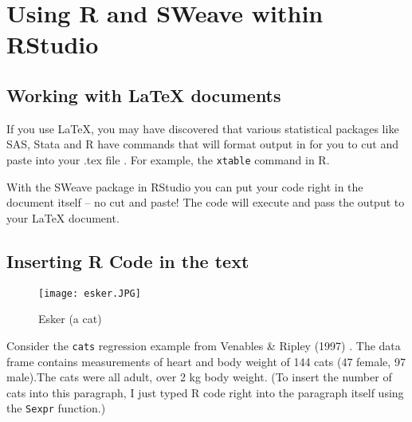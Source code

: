 \chapter{Using R and SWeave within RStudio} 
\label{R and SWeave}

\section{Working with \LaTeX{} documents}
If you use \LaTeX{}, you may have discovered that various statistical packages like SAS, Stata and R have commands that will format output in  for you to cut and paste into your .tex file \cite{HelpStatPack}.   For example, the \texttt{xtable} command in R.  

With the SWeave package in RStudio you can put your code right in the document itself -- no cut and paste!  The code will execute and pass the output to your \LaTeX{} document.


\section{Inserting R Code in the text}
\begin{wrapfigure}[8]{r}{0.4\textwidth}
  \vspace{-20pt}
  \begin{center}
    \texttt{[image: esker.JPG]}
  \end{center}
    \vspace{-20pt}
  \caption{Esker (a cat)}
\end{wrapfigure}

Consider the \texttt{cats} regression example from Venables \& Ripley
(1997) \cite{Venables:1997fk}. The data frame contains measurements of heart and body weight
of 144 cats (47 female,
97 male).The cats were all adult, over 2 kg body weight.   (To insert the number of cats into this paragraph, I just typed R code right into the paragraph itself using the \texttt{Sexpr} function.)


